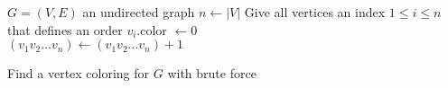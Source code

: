 \documentclass{article}
\begin{document}
\begin{preview}
    \begin{algorithm}[H]
        \begin{algorithmic}
            \Require $G = (V, E)$ an undirected graph
            \State $n \gets |V|$
            \State Give all vertices an index $1 \leq i \leq n$ that defines an order
                \State $v_i$.color $\gets 0$
            \EndFor
            \\
                \State \Return
            \Else
                        \State $(v_1 v_2 \dots v_n) \gets (v_1 v_2 \dots v_n) + 1$ 
                    \EndWhile
                \EndFor
            \EndIf
        \end{algorithmic}
    \caption{Find a vertex coloring for $G$ with brute force}
    \label{alg:vertexColoring}
    \end{algorithm}
\end{preview}
\end{document}

